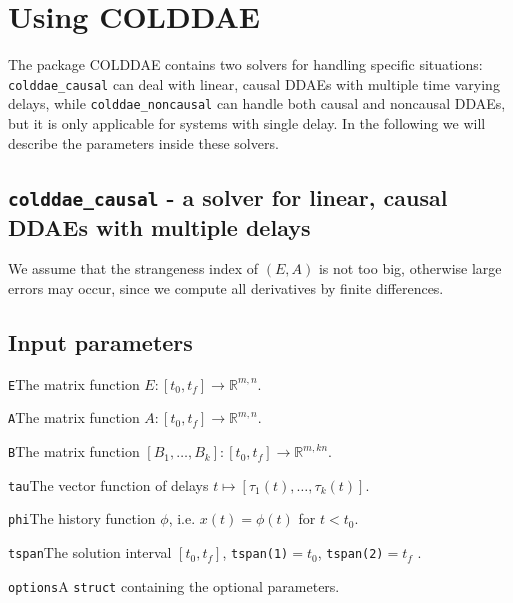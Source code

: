 \documentclass[final,reqno]{siamltex}
\renewenvironment{itemize}[1]{\begin{compactitem}#1}{\end{compactitem}}
\begin{document}
\section{Using COLDDAE}

The package COLDDAE contains two solvers for handling specific situations: {\tt colddae\_causal} can deal with linear, causal DDAEs with multiple time varying delays, 
while {\tt colddae\_noncausal} can handle both causal and noncausal DDAEs, but it is only applicable for systems with single delay. 
In the following we will describe the parameters inside these solvers.

\subsection{{\tt colddae\_causal} - a solver for linear, causal DDAEs with multiple delays}

We assume that the strangeness index of $(E,A)$ is not too big, otherwise large errors may occur, since we compute all derivatives by finite differences.

\subsection{Input parameters}
\begin{itemize}
\item {\tt E}\quad The matrix function $E:[t_0,t_f]\rightarrow \mathbb{R}^{m,n}$.
\item {\tt A}\quad The matrix function $A:[t_0,t_f]\rightarrow \mathbb{R}^{m,n}$.
\item {\tt B}\quad The matrix function $[B_1,\ldots,B_{k}]:[t_0,t_f]\rightarrow \mathbb{R}^{m,k n}$.
\item {\tt tau}\quad  The vector function of delays $t\mapsto[\tau_1(t),\ldots,\tau_{k}(t)]$.
\item {\tt phi}\quad The history function $\phi$, i.e. $x(t)=\phi(t)$ for $t < t_0$.
\item {\tt tspan}\quad The solution interval $[t_0,t_f]$, {\tt tspan(1)}$ = t_0$, {\tt tspan(2)}$ = t_f$ .
\item {\tt options}\quad A {\tt struct} containing the optional parameters.
\end{itemize}
\end{document}
